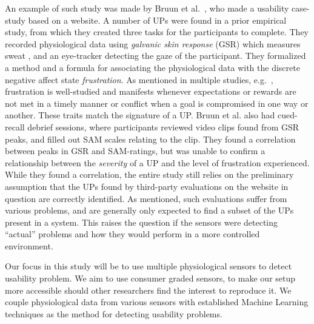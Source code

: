 An example of such study was made by Bruun et al.~\cite{LH-paper}, who made a usability case-study based on a website.
A number of UPs were found in a prior empirical study, from which they created three tasks for the participants to complete.
They recorded physiological data using \textit{galvanic skin response} (GSR) which measures sweat \cite{gsr_calibration}, and an eye-tracker detecting the gaze of the participant.
They formalized a method and a formula for associating the physiological data with the discrete negative affect state \textit{frustration}.
As mentioned in multiple studies, e.g.~\cite{LH-paper,frustration_with_computers}, frustration is well-studied
and manifests whenever expectations or rewards are not met in a timely manner or conflict when a goal is compromised in one way or another.
These traits match the signature of a UP.
Bruun et al. also had cued-recall debrief sessions, where participants reviewed video clips found from GSR peaks, and filled out SAM scales relating to the clip. 
They found a correlation between peaks in GSR and SAM-ratings, but was unable to confirm a relationship between the
\textit{severity} of a UP and the level of frustration experienced.
While they found a correlation, the entire study still relies on the preliminary assumption that the UPs found by
third-party evaluations on the website in question are correctly identified.
As mentioned, such evaluations suffer from various problems, and are generally only expected to find a subset of the UPs present in a system. 
This raises the question if the sensors were detecting ``actual'' problems and how they would perform in a more controlled environment.

Our focus in this study will be to use multiple physiological sensors to detect usability problem. We aim to use
consumer graded sensors, to make our setup more accessible should other researchers find the interest to reproduce
it. We couple physiological data from various sensors with established Machine Learning techniques as the method for
detecting usability problems.